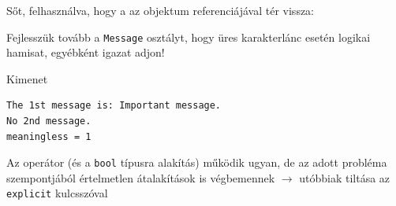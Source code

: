 \documentclass[usenames,dvipsnames,aspectratio=169]{beamer}
\begin{document}
\begin{frame}
    Sőt, felhasználva, hogy a  az objektum referenciájával tér vissza:
    \begin{exampleblock}{}
        \footnotesize
        
    \end{exampleblock}
    \vfill
    Fejlesszük tovább a \texttt{Message} osztályt, hogy üres karakterlánc esetén logikai hamisat, egyébként igazat adjon!
\end{frame}

\begin{frame}
    \begin{exampleblock}{}
        \small
        
        
        
    \end{exampleblock}
\end{frame}

\begin{frame}
    \begin{exampleblock}{}
        \scriptsize
        \vspace{-.2cm}
        
        \vspace{-.2cm}
    \end{exampleblock}
\end{frame}

\begin{frame}[fragile]
    \begin{block}{Kimenet}
        \vspace{-.2cm}
        \begin{verbatim}
The 1st message is: Important message.
No 2nd message.
meaningless = 1
\end{verbatim}             
        \vspace{-.2cm}
    \end{block}
    Az operátor (és a \texttt{bool} típusra alakítás) működik ugyan, de az adott probléma szempontjából értelmetlen átalakítások is végbemennek $\to$ utóbbiak tiltása az \texttt{explicit} kulcsszóval
\end{frame}
\end{document}
